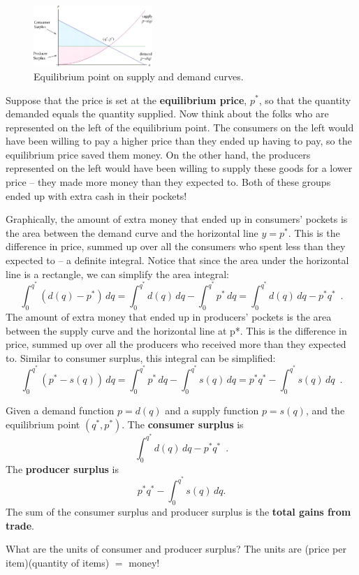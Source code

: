 \begin{figure}[!ht]
  \centering
    \includegraphics[width=0.4\textwidth]{img/chap5/image063.png}
    \caption{Equilibrium point on supply and demand curves.}
    \label{fig:5-8-equilibrium}
\end{figure}
Suppose that the price is set at the {\bf equilibrium price}, $p^{*}$, so that the quantity demanded equals the quantity supplied. Now think about the folks who are represented on the left of the equilibrium point. The consumers on the left would have been willing to pay a higher price than they ended up having to pay, so the equilibrium price saved them money. On the other hand, the producers represented on the left would have been willing to supply these goods for a lower price -- they made more money than they expected to. Both of these groups ended up with extra cash in their pockets!

Graphically, the amount of extra money that ended up in consumers' pockets is the area between the demand curve and the horizontal line $y = p^{*}$. This is the difference in price, summed up over all the consumers who spent less than they expected to -- a definite integral. Notice that since the area under the horizontal line is a rectangle, we can simplify the area integral:
$$\int_0^{q^{*}}(d(q)-p^{*})\,dq = \int_0^{q^{*}}d(q)\,dq-\int_0^{q^{*}}p^{*}\,dq = \int_0^{q^{*}}d(q)\,dq - p^{*}q^{*} \enspace .$$
The amount of extra money that ended up in producers' pockets is the area between the supply curve and the horizontal line at p*. This is the difference in price, summed up over all the producers who received more than they expected to. Similar to consumer surplus, this integral can be simplified:
$$\int_0^{q^{*}}(p^{*} - s(q))\,dq = \int_0^{q^{*}}p^{*}\,dq - \int_0^{q^{*}}s(q)\,dq = p^{*}q^{*} - \int_0^{q^{*}}s(q)\,dq \enspace .$$
\begin{definition}
Given a demand function $p=d(q)$ and a supply function $p=s(q)$, and the equilibrium point $(q^{*},p^{*})$.
The {\bf consumer surplus} is
$$\int_0^{q^{*}}d(q)\,dq - p^{*}q^{*} \enspace .$$
The {\bf producer surplus} is
$$p^{*}q^{*} - \int_0^{q^{*}}s(q)\,dq.$$
The sum of the consumer surplus and producer surplus is the {\bf total gains from trade}.
\end{definition}
What are the units of consumer and producer surplus? The units are (price per item)(quantity of items) $=$ money!

